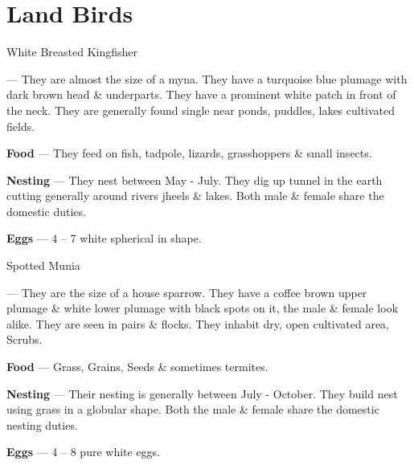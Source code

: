 \part{Land Birds}

\begin{bird}{White Breasted Kingfisher}

 --- They are almost the size of a myna. They have a turquoise blue plumage with dark brown head \& underparts. They  have a prominent white patch in front of the neck. They are generally found single near ponds, puddles, lakes cultivated fields.

{\large\bf Food} --- They feed on fish, tadpole, lizards, grasshoppers \& small insects.

{\large\bf Nesting} --- They nest between May - July. They dig up tunnel in the earth cutting generally around rivers jheels \& lakes. Both male \& female share the domestic duties.

{\large\bf Eggs} --- 4 -- 7 white spherical in shape.
\end{bird}

\begin{bird}{Spotted Munia}

 --- They are the size of a house sparrow. They have a coffee brown upper plumage \& white lower plumage with black spots on it, the male \& female look alike. They are seen in pairs \& flocks. They inhabit dry, open cultivated area, Scrubs. 

{\large\bf Food} --- Grass, Grains, Seeds \& sometimes termites.

{\large\bf Nesting} --- Their nesting is generally between July - October. They build nest using grass in a globular shape. Both the male \& female share the domestic nesting duties.

{\large\bf Eggs} --- 4 -- 8 pure white eggs.
\end{bird}

